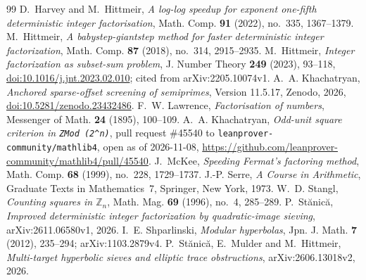\documentclass[11pt]{amsart}
\theoremstyle{remark}
\begin{document}
\begin{thebibliography}{99}
 D.~Harvey and M.~Hittmeir, \emph{A log-log speedup for exponent one-fifth deterministic integer factorisation}, Math. Comp. \textbf{91} (2022), no.~335, 1367--1379.
 M.~Hittmeir, \emph{A babystep-giantstep method for faster deterministic integer factorization}, Math. Comp. \textbf{87} (2018), no.~314, 2915--2935.
 M.~Hittmeir, \emph{Integer factorization as subset-sum problem}, J. Number Theory \textbf{249} (2023), 93--118, \href{https://doi.org/10.1016/j.jnt.2023.02.010}{doi:10.1016/j.jnt.2023.02.010}; cited from arXiv:2205.10074v1.
 A.~A. Khachatryan, \emph{Anchored sparse-offset screening of semiprimes}, Version 11.5.17, Zenodo, 2026, \href{https://doi.org/10.5281/zenodo.23432486}{doi:10.5281/zenodo.23432486}.
 F.~W. Lawrence, \emph{Factorisation of numbers}, Messenger of Math. \textbf{24} (1895), 100--109.
 A.~A. Khachatryan, \emph{Odd-unit square criterion in \texttt{ZMod (2\textasciicircum n)}}, pull request \#45540 to \texttt{leanprover-community/mathlib4}, open as of 2026-11-08, \url{https://github.com/leanprover-community/mathlib4/pull/45540}.
 J.~McKee, \emph{Speeding Fermat's factoring method}, Math. Comp. \textbf{68} (1999), no.~228, 1729--1737.
 J.-P. Serre, \emph{A Course in Arithmetic}, Graduate Texts in Mathematics~7, Springer, New York, 1973.
 W.~D. Stangl, \emph{Counting squares in $\mathbb{Z}_n$}, Math. Mag. \textbf{69} (1996), no.~4, 285--289.
 P.~Stănică, \emph{Improved deterministic integer factorization by quadratic-image sieving}, arXiv:2611.06580v1, 2026.
 I.~E. Shparlinski, \emph{Modular hyperbolas}, Jpn. J. Math. \textbf{7} (2012), 235--294; arXiv:1103.2879v4.
 P.~Stănică, E.~Mulder and M.~Hittmeir, \emph{Multi-target hyperbolic sieves and elliptic trace obstructions}, arXiv:2606.13018v2, 2026.
\end{thebibliography}
\end{document}
